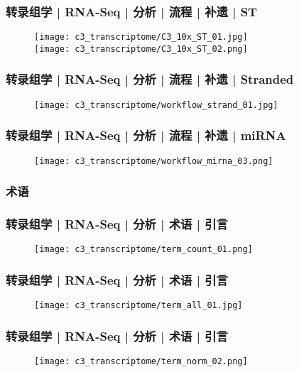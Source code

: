 \begin{frame}
  \frametitle{转录组学 | RNA-Seq | 分析 | 流程 | 补遗 | ST}
  \begin{figure}
    \centering
    \texttt{[image: c3\_transcriptome/C3\_10x\_ST\_01.jpg]}\\
    \vspace{1em}
    \texttt{[image: c3\_transcriptome/C3\_10x\_ST\_02.png]}
  \end{figure}
\end{frame}

\begin{frame}
  \frametitle{转录组学 | RNA-Seq | 分析 | 流程 | 补遗 | Stranded}
  \begin{figure}
    \centering
    \texttt{[image: c3\_transcriptome/workflow\_strand\_01.jpg]}
  \end{figure}
\end{frame}

\begin{frame}
  \frametitle{转录组学 | RNA-Seq | 分析 | 流程 | 补遗 | miRNA}
  \begin{figure}
    \centering
    \texttt{[image: c3\_transcriptome/workflow\_mirna\_03.png]}
  \end{figure}
\end{frame}

\subsubsection{术语}
\begin{frame}
  \frametitle{转录组学 | RNA-Seq | 分析 | 术语 | 引言}
  \begin{figure}
    \centering
    \texttt{[image: c3\_transcriptome/term\_count\_01.png]}
  \end{figure}
\end{frame}

\begin{frame}
  \frametitle{转录组学 | RNA-Seq | 分析 | 术语 | 引言}
  \begin{figure}
    \centering
    \texttt{[image: c3\_transcriptome/term\_all\_01.jpg]}
  \end{figure}
\end{frame}

\begin{frame}
  \frametitle{转录组学 | RNA-Seq | 分析 | 术语 | 引言}
  \begin{figure}
    \centering
    \texttt{[image: c3\_transcriptome/term\_norm\_02.png]}
  \end{figure}
\end{frame}

